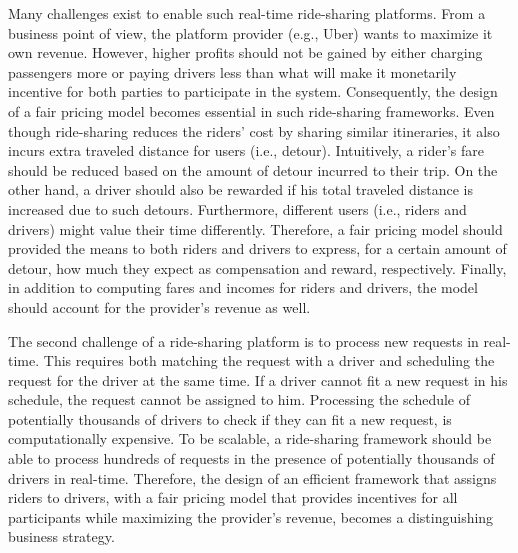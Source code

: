 Many challenges exist to enable such real-time ride-sharing platforms. From a business point of view, the platform provider (e.g., Uber) wants to maximize it own revenue. However, higher profits should not be gained by either charging passengers more or paying drivers less than what will make it monetarily incentive for both parties to participate in the system. Consequently, the design of a fair pricing model becomes essential in such ride-sharing frameworks. Even though ride-sharing reduces the riders' cost by sharing similar itineraries, it also incurs extra traveled distance for users (i.e., detour). Intuitively, a rider's fare should be reduced based on the amount of detour incurred to their trip. On the other hand, a driver should also be rewarded if his total traveled distance is increased due to such detours. Furthermore, different users (i.e., riders and drivers) might value their time differently. Therefore, a fair pricing model should provided the means to both riders and drivers to express, for a certain amount of detour, how much they expect as compensation and reward, respectively. Finally, in addition to computing fares and incomes for riders and drivers, the model should account for the provider's revenue as well.

The second challenge of a ride-sharing platform is to process new requests in real-time. This requires both matching the request with a driver and scheduling the request for the driver at the same time. If a driver cannot fit a new request in his schedule, the request cannot be assigned to him. Processing the schedule of potentially thousands of drivers to check if they can fit a new request, is computationally expensive. To be scalable, a ride-sharing framework should be able to process hundreds of requests in the presence of potentially thousands of drivers in real-time. Therefore, the design of an efficient framework that assigns riders to drivers, with a fair pricing model that provides incentives for all participants while maximizing the provider's revenue, becomes a distinguishing business strategy.


